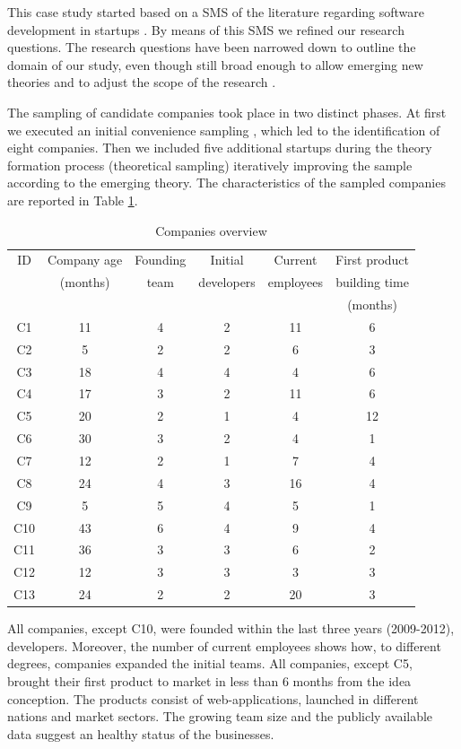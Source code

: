 \documentclass[10pt,journal,letterpaper,compsoc]{IEEEtran}
\begin{document}
This case study started based on a SMS of the literature regarding software
development in startups \cite{SMS}. By means of this SMS we refined our research
questions. The research questions have been narrowed down to outline the domain
of our study, even though still broad enough to allow emerging new theories and
to adjust the scope of the research \cite{Corbin1990}.

The sampling of candidate companies took place in two distinct phases. At first
we executed an initial convenience sampling \cite{Dawson2009}, which led to the
identification of eight companies. Then we included five additional startups
during the theory formation process (theoretical sampling) iteratively improving
the sample according to the emerging theory. The characteristics of the sampled
companies are reported in Table \ref{t_interviews-stats}.


\begin{table}[!t]
\renewcommand{\arraystretch}{1.3}
\caption{Companies overview}
\label{t_interviews-stats}
\centering
\begin{tabular}{|c||c||c||c||c||c|}

\hline
    ID & Company age & Founding & Initial & Current & First product \\
    & (months) & team & developers & employees & building time \\
                    & & & & & (months) \\
   \hline
C1 & 11 & 4 & 2 & 11 & 6 \\
C2 & 5 & 2 & 2 & 6 & 3 \\
C3 & 18 & 4 & 4 & 4 & 6 \\
C4 & 17 & 3 & 2 & 11 & 6 \\
C5 & 20 & 2 & 1 & 4 & 12 \\
C6 & 30 & 3 & 2 & 4 & 1 \\
C7 & 12 & 2 & 1 & 7 & 4 \\
C8 & 24 & 4 & 3 & 16 & 4 \\
C9 & 5 & 5 & 4 & 5 & 1 \\
C10 & 43 & 6 & 4 & 9 & 4 \\
C11 & 36 & 3 & 3 & 6 & 2 \\
C12 & 12 & 3 & 3 & 3 & 3 \\
C13 & 24 & 2 & 2 & 20 & 3 \\
 
\hline
\end{tabular}
\end{table}

All companies, except C10, were founded within the last three years (2009-2012),
developers.  Moreover, the number of current employees shows how, to different
degrees,  companies expanded the initial teams. All companies, except C5,
brought their  first product to market in less than 6 months from the idea
conception. The  products consist of web-applications, launched in different
nations and market  sectors. The growing team size and the publicly available
data suggest an  healthy status of the businesses.
\end{document}
